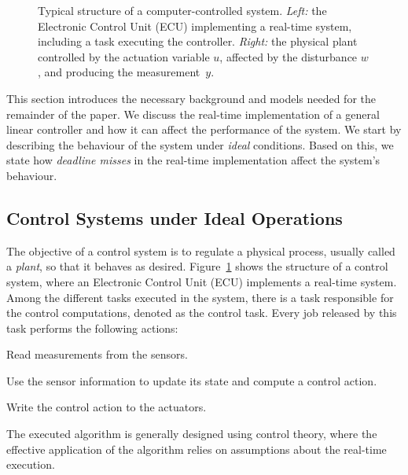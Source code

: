 \begin{figure}
    \centerline{}
    \caption{Typical structure of a computer-controlled system. \emph{Left:} the Electronic Control Unit (ECU) implementing a real-time system, including a task executing the controller. \emph{Right:} the physical plant controlled by the actuation variable $u$, affected by the disturbance $w$, and producing the measurement~$y$.}
    \label{fig:ctrl-loop}
\end{figure}

This section introduces the necessary background and models needed for the remainder of the paper.
We discuss the real-time implementation of a general linear controller and how it can affect the performance of the system. 
We start by describing the behaviour of the system under \emph{ideal} conditions. 
Based on this, we state how \emph{deadline misses} in the real-time implementation affect the system's behaviour.

\subsection{Control Systems under Ideal Operations}
The objective of a control system is to regulate a physical process, usually called a \emph{plant}, so that it behaves as desired. 
Figure~\ref{fig:ctrl-loop} shows the structure of a control system, where an Electronic Control Unit (ECU) implements a real-time system. 
Among the different tasks executed in the system, there is a task responsible for the control computations, denoted as the control task.
Every job released by this task performs the following actions:
\begin{enumerate*}[label=(\roman*)]
    \item Read measurements from the sensors.
    \item Use the sensor information to update its state and compute a control action. 
    \item Write the control action to the actuators.
\end{enumerate*}
The executed algorithm is generally designed using control theory, where the effective application of the algorithm relies on assumptions about the real-time execution.  

